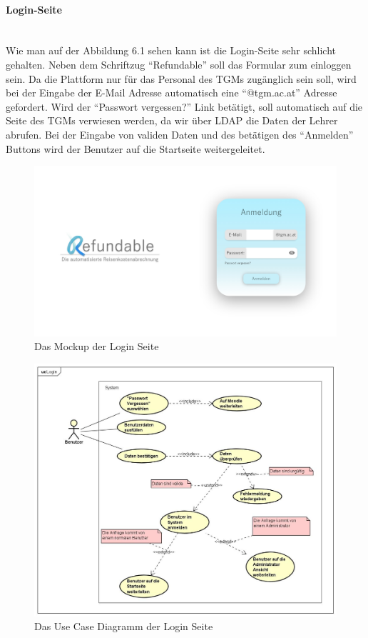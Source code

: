 \paragraph{Login-Seite}
~\\
Wie man auf der Abbildung 6.1 sehen kann ist die Login-Seite sehr schlicht gehalten. Neben dem Schriftzug \enquote{Refundable} soll das Formular zum einloggen sein. Da die Plattform nur für das Personal des TGMs zugänglich sein soll, wird bei der Eingabe der E-Mail Adresse automatisch eine \enquote{@tgm.ac.at} Adresse gefordert. Wird der \enquote{Passwort vergessen?} Link betätigt, soll automatisch auf die Seite des TGMs verwiesen werden, da wir über LDAP die Daten der Lehrer abrufen. Bei der Eingabe von validen Daten und des betätigen des \enquote{Anmelden} Buttons wird der Benutzer auf die Startseite weitergeleitet.
\begin{figure}[H]
	\centering
	\includegraphics[width=1\linewidth]{images/Mockup-Startseite}
	\caption[Mockup Login]{Das Mockup der Login Seite}
	\label{fig:mockupLogin}
\end{figure}
\begin{figure}[H]
	\centering
	\includegraphics[width=1\linewidth]{images/uc-login}
	\caption[Use Case Diagramm Login]{Das Use Case Diagramm der Login Seite}
	\label{fig:ucLogin}
\end{figure}
